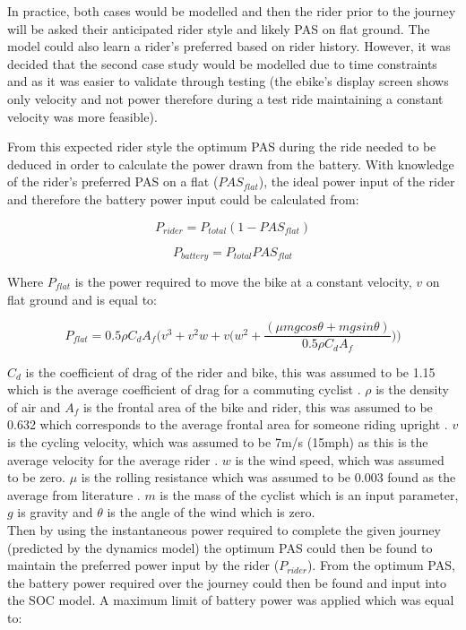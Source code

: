 \documentclass[a4paper, 10pt]{article}
\numberwithin{equation}{section}
\begin{document}
In practice, both cases would be modelled and then the rider prior to the journey will be asked their anticipated rider style and likely PAS on flat ground. The model could also learn a rider's preferred based on rider history. However, it was decided that the second case study would be modelled due to time constraints and as it was easier to validate through testing (the ebike's display screen shows only velocity and not power therefore during a test ride maintaining a constant velocity was more feasible).

From this expected rider style the optimum PAS during the ride needed to be deduced in order to calculate the power drawn from the battery. With knowledge of the rider's preferred PAS on a flat ($PAS_{flat}$), the ideal power input of the rider and therefore the battery power input could be calculated from:

\begin{equation}
    P_{rider} = P_{total}(1-PAS_{flat})
\end{equation}

\begin{equation}
    P_{battery} = P_{total}PAS_{flat}
\end{equation}

Where $P_{flat}$ is the power required to move the bike at a constant velocity, $v$ on flat ground and is equal to:

\begin{equation}
    P_{flat} = 0.5\rho C_{d}A_{f}\Bigg(v^3 + v^2w +v\bigg(w^2 + \frac{(\mu mgcos\theta + mgsin\theta)}{0.5\rho C_{d}A_{f}}\bigg)\Bigg)
\end{equation}

$C_d$ is the coefficient of drag of the rider and bike, this was assumed to be 1.15 which is the average coefficient of drag for a commuting cyclist \cite{report:cd_bikes}. $\rho$ is the density of air and $A_f$ is the frontal area of the bike and rider, this was assumed to be 0.632 which corresponds to the average frontal area for someone riding upright \cite{af_bikes}. $v$ is the cycling velocity, which was assumed to be 7m/s (15mph) as this is the average velocity for the average rider \cite{report:cd_bikes}. $w$ is the wind speed, which was assumed to be zero. $\mu$ is the rolling resistance which was assumed to be 0.003 found as the average from literature \cite{book:av_rolling_res}. $m$ is the mass of the cyclist which is an input parameter, $g$ is gravity and $\theta$ is the angle of the wind which is zero.
\\
Then by using the instantaneous power required to complete the given journey (predicted by the dynamics model) the optimum PAS could then be found to maintain the preferred power input by the rider ($P_{rider}$). From the optimum PAS, the battery power required over the journey could then be found and input into the SOC model. A maximum limit of battery power was applied which was equal to:
\end{document}
